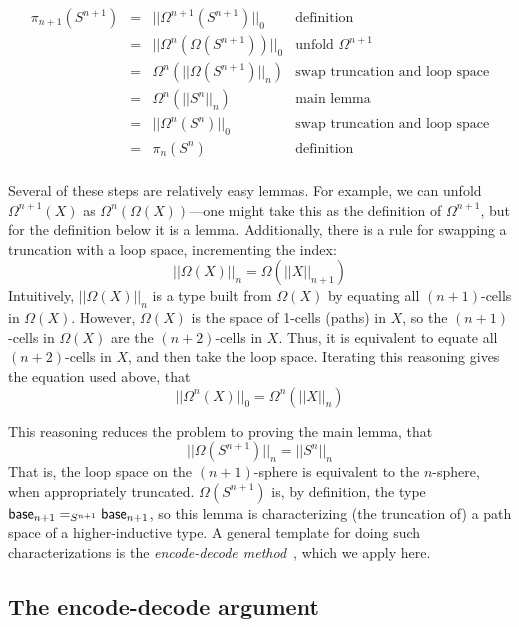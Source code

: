 \[
\begin{array}{rcll}
\pi_{n+1}(S^{n+1}) & = & ||\Omega^{n+1}(S^{n+1})||_0 & \text{definition}\\
                  & = & ||\Omega^{n}(\Omega(S^{n+1}))||_0 & \text{unfold $\Omega^{n+1}$} \\
                  & = & \Omega^{n}(||\Omega(S^{n+1})||_n) & \text{swap truncation and loop space} \\
                  & = & \Omega^{n}(||S^{n}||_n) & \text{main lemma} \\
                  & = & ||\Omega^{n}(S^{n})||_0 & \text{swap truncation and loop space} \\
                  & = & \pi_n(S^n) & \text{definition} \\
\end{array}
\]

Several of these steps are relatively easy lemmas.  For example, we can
unfold $\Omega^{n+1}(X)$ as $\Omega^n(\Omega(X))$---one might
take this as the definition of $\Omega^{n+1}$, but for the definition
below it is a lemma.  Additionally, there is a rule for swapping
a truncation with a loop space, incrementing the index:
\[
||\Omega(X)||_n = \Omega(||X||_{n+1})
\]
Intuitively, $||\Omega(X)||_n$ is a type built from $\Omega(X)$ by
equating all $(n+1)$-cells in $\Omega(X)$.  However, $\Omega(X)$ is the
space of 1-cells (paths) in $X$, so the $(n+1)$-cells in $\Omega(X)$ are the
$(n+2)$-cells in $X$.  Thus, it is equivalent to equate all $(n+2)$-cells in
$X$, and then take the loop space.  Iterating this reasoning gives the
equation used above, that
\[
||\Omega^n(X)||_0 = \Omega^n(||X||_{n})
\]

This reasoning reduces the problem to proving the main lemma, that 
\[
||\Omega(S^{n+1})||_n = ||S^{n}||_n
\]
That is, the loop space on the $(n+1)$-sphere is equivalent to the
$n$-sphere, when appropriately truncated.  $\Omega(S^{n+1})$ is, by
definition, the type $\mathsf{base}_{n+1} =_{S^{n+1}} \mathsf{base}_{n+1}$, 
so this lemma is characterizing (the truncation of) a path space of a
higher-inductive type.  A general template for doing such
characterizations is the 
\emph{encode-decode method}~\citep[Section 8.9]{uf13hott-book}, which we
apply here.  

\subsection{The encode-decode argument}
\label{sec:encode-decode}

